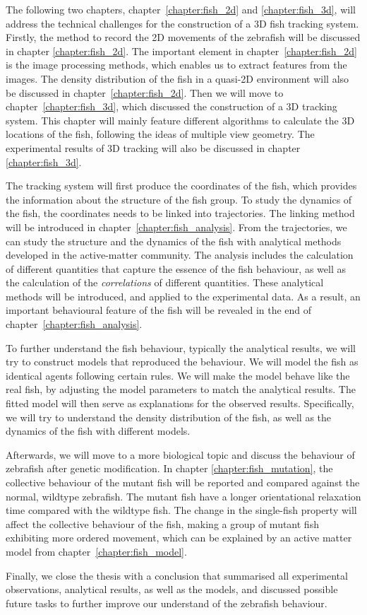 \documentclass[11pt,twoside]{report}
\begin{document}
The following two chapters, chapter~\ref{chapter:fish_2d} and \ref{chapter:fish_3d}, will address the technical challenges for the construction of a 3D fish tracking system. Firstly, the method to record the 2D movements of the zebrafish will be discussed in chapter \ref{chapter:fish_2d}. The important element in chapter~\ref{chapter:fish_2d} is the image processing methods, which enables us to extract features from the images. The density distribution of the fish in a quasi-2D environment will also be discussed in chapter~\ref{chapter:fish_2d}. 
Then we will move to chapter~\ref{chapter:fish_3d}, which discussed the construction of a 3D tracking system. 
This chapter will mainly feature different algorithms to calculate the 3D locations of the fish, following the ideas  of multiple view geometry. The experimental results of 3D tracking will also be discussed in chapter \ref{chapter:fish_3d}.


The tracking system will first produce the coordinates of the fish, which provides the information about the structure of the fish group. To study the dynamics of the fish, the coordinates needs to be linked into trajectories. The linking method will be introduced in chapter~\ref{chapter:fish_analysis}. From the trajectories, we can study the structure and the dynamics of the fish with analytical methods developed in the active-matter community. The analysis includes the calculation of different quantities that capture the essence of the fish behaviour, as well as the calculation of the \emph{correlations} of different quantities. These analytical methods will be introduced, and applied to the experimental data. As a result, an important behavioural feature of the fish will be revealed in the end of chapter~\ref{chapter:fish_analysis}.


To further understand the fish behaviour, typically the analytical results, we will try to construct models that reproduced the behaviour. We will model the fish as identical agents following certain rules. We will make the model behave like the real fish, by adjusting the model parameters to match the analytical results. The fitted model will then serve as explanations for the observed results. Specifically, we will try to understand the density distribution of the fish, as well as the dynamics of the fish with different models.


Afterwards, we will move to a more biological topic and discuss the behaviour of zebrafish after genetic modification. In chapter \ref{chapter:fish_mutation}, the collective behaviour of the mutant fish will be reported and compared against the normal, wildtype zebrafish.
The mutant fish have a longer orientational relaxation time compared with the wildtype fish.
The change in the single-fish property will affect the collective behaviour of the fish, making a group of mutant fish exhibiting more ordered movement, which can be explained by an active matter model from chapter~\ref{chapter:fish_model}.


Finally, we close the thesis with a conclusion that summarised all experimental observations, analytical results, as well as the models, and discussed possible future tasks to further improve our understand of the zebrafish behaviour.
\end{document}
